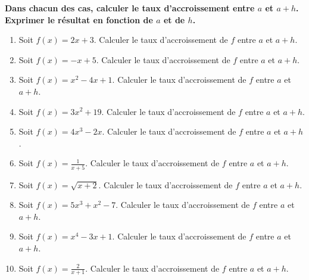 \documentclass[11pt]{article}
\begin{document}
\begin{exercice}
\textbf{Dans chacun des cas, calculer le taux d'accroissement entre
$a$ et $a+h$. Exprimer le résultat en fonction de $a$ et de $h$.}
\begin{enumerate}
    \item Soit \( f(x) = 2x + 3 \). Calculer le taux d'accroissement de \( f \) entre \( a \) et \( a + h \).
    
    \item Soit \( f(x) = -x + 5 \). Calculer le taux d'accroissement de \( f \) entre \( a \) et \( a + h \).
    
    \item Soit \( f(x) = x^2 - 4x + 1 \). Calculer le taux d'accroissement de \( f \) entre \( a \) et \( a + h \).
    
    \item Soit \( f(x) = 3x^2 + 19 \). Calculer le taux d'accroissement de \( f \) entre \( a \) et \( a + h \).
    
    \item Soit \( f(x) = 4x^3 - 2x \). Calculer le taux d'accroissement de \( f \) entre \( a \) et \( a + h \).
    
    \item Soit \( f(x) = \frac{1}{x+5} \). Calculer le taux d'accroissement de \( f \) entre \( a \) et \( a + h \).
    
    \item Soit \( f(x) = \sqrt{x+2} \). Calculer le taux d'accroissement de \( f \) entre \( a \) et \( a + h \).
    
    \item Soit \( f(x) = 5x^3 + x^2 - 7 \). Calculer le taux d'accroissement de \( f \) entre \( a \) et \( a + h \).
    
    \item Soit \( f(x) = x^4 - 3x + 1 \). Calculer le taux d'accroissement de \( f \) entre \( a \) et \( a + h \).
    
    \item Soit \( f(x) = \frac{2}{x+1} \). Calculer le taux d'accroissement de \( f \) entre \( a \) et \( a + h \).
\end{enumerate}
\end{exercice}
\end{document}
